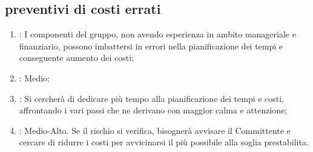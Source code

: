 \subsection{preventivi di costi errati}
\begin{enumerate}
\item {}: I componenti del gruppo, non avendo esperienza in ambito manageriale e finanziario, possono imbattersi in errori nella pianificazione dei tempi e conseguente aumento dei costi;
\item {}: Medio;
\item {}: Si cercherà di dedicare più tempo alla pianificazione dei tempi e costi, affrontando i vari passi che ne derivano con maggior calma e attenzione;
\item {}: Medio-Alto. Se il rischio si verifica, bisognerà avvisare il Committente e cercare di ridurre i costi per avvicinarsi il più possibile alla soglia prestabilita.
\end{enumerate}
